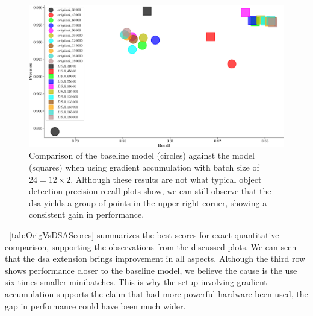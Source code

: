 \begin{figure}[t]
    \centerline{\includegraphics[width=\linewidth]{figures/siamese_tracking/tracker_cmp_160_2x12_vs_160_2x2_DSA_GA_rec_prec.pdf}}
    \caption[\gls{dsa} evaluation with gradient accumulation - secondary metrics]{Comparison of the baseline model (circles) against the \dsamodel{} model (squares) when using gradient accumulation with batch size of $24 = 12 \times 2$. Although these results are not what typical object detection precision-recall plots show, we can still observe that the \gls{dsa} yields a group of points in the upper-right corner, showing a consistent gain in performance.}
    \label{fig:OrigVsDSA_160RPN_GA_Prec_Rec}
\end{figure}

\tabletext{}~\ref{tab:OrigVsDSAScores} summarizes the best scores for exact quantitative comparison, supporting the observations from the discussed plots. We can seen that the \gls{dsa} extension brings improvement in all aspects. Although the third row shows performance closer to the baseline model, we believe the cause is the use six times smaller minibatches. This is why the setup involving gradient accumulation supports the claim that had more powerful hardware been used, the gap in performance could have been much wider.

